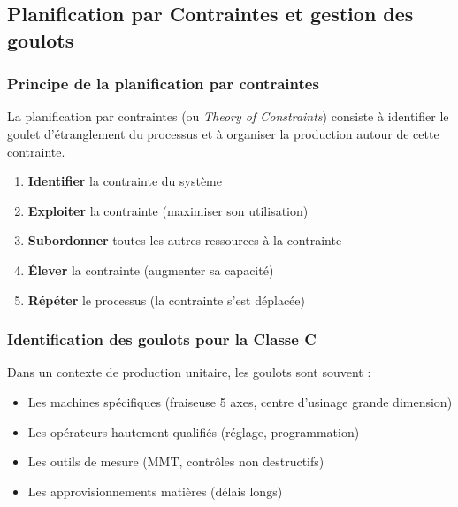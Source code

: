 \documentclass{article}
\begin{document}
\begin{table}[h]
\subsection{Planification par Contraintes et gestion des goulots}

\subsubsection{Principe de la planification par contraintes}

La planification par contraintes (ou \textit{Theory of Constraints}) consiste à identifier le goulet d'étranglement du processus et à organiser la production autour de cette contrainte.

\begin{tcolorbox}[colback=vertclair, colframe=green!50!black, title=La méthode des 5 étapes (Goldratt)]
\begin{enumerate}
    \item \textbf{Identifier} la contrainte du système
    \item \textbf{Exploiter} la contrainte (maximiser son utilisation)
    \item \textbf{Subordonner} toutes les autres ressources à la contrainte
    \item \textbf{Élever} la contrainte (augmenter sa capacité)
    \item \textbf{Répéter} le processus (la contrainte s'est déplacée)
\end{enumerate}
\end{tcolorbox}

\subsubsection{Identification des goulots pour la Classe C}

Dans un contexte de production unitaire, les goulots sont souvent :

\begin{itemize}
    \item Les machines spécifiques (fraiseuse 5 axes, centre d'usinage grande dimension)
    \item Les opérateurs hautement qualifiés (réglage, programmation)
    \item Les outils de mesure (MMT, contrôles non destructifs)
    \item Les approvisionnements matières (délais longs)
\end{itemize}


\end{table}
\end{document}
